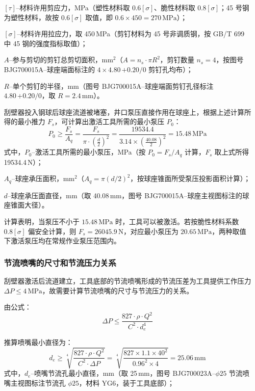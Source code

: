 $[\tau]$--材料许用剪应力，MPa（塑性材料取 $0.6[\sigma]$、脆性材料取 $0.8[\sigma]$；45 号钢为塑性材料，故按 $0.6[\sigma]$ 取值，即 $0.6\times450 = 270\,\mathrm{MPa}$）；

$[\sigma]$--材料许用拉应力，取 450\,MPa（剪钉材料为 45 号非调质钢，按 GB/T 699 中 45 钢的强度指标取值）；

$A$--参与剪切的剪钉总剪切面积，mm$^2$（$A = n_s \cdot \pi R^2$，剪钉数量 $n_s = 4$，按图号 BJG700015A--球座端面标注的 $4\times 4.80\,{+0.20}/0$ 剪钉孔均布）；

$R$--单个剪钉的半径，mm（图号 BJG700015A--球座端面剪钉孔径标注 $4.80\,{+0.20}/0$，取 $R = 2.4$\,mm）。

刮壁器投入钢球后球座流道被堵塞，井口泵压直接作用在球座上，根据上述计算所得的最小推力 $F_s$，可计算出激活工具所需的最小泵压 $P_0$：
\begin{equation}
    P_0 \ge \frac{F_s}{A_q} = \frac{F_s}{\pi \cdot \left(\frac{d}{2}\right)^2} = \frac{19534.4}{3.14 \times \left(\frac{40.08}{2}\right)^2} = 15.48\,\mathrm{MPa}
\end{equation}
式中，$P_0$--激活工具所需的最小泵压，MPa（按 $P_0 = F_s/A_q$ 计算，$F_s$ 取上式所得 19534.4\,N）；

$A_q$--球座承压面积，mm$^2$（$A_q = \pi (d/2)^2$，按球座锥面所受泵压投影面积计算）；

$d$--球座承压面直径，mm（取 40.08\,mm，图号 BJG700015A--球座主视图标注的球座锥面大径）。

计算表明，当泵压不小于 $15.48\,\mathrm{MPa}$ 时，工具可以被激活。若按脆性材料系数 $0.8[\sigma]$ 偏安全计算，则 $F_s = 26045.9\,\mathrm{N}$，对应最小泵压为 $20.65\,\mathrm{MPa}$，两种取值下激活泵压均在常规作业泵压范围内。


\subsubsection{节流喷嘴的尺寸和节流压力关系}

刮壁器激活后流道建立，工具底部的节流喷嘴形成的节流压差为工具提供工作压力 $\Delta P \le 4\,\mathrm{MPa}$，故需要计算节流喷嘴的尺寸与节流压力的关系。

由公式：
\begin{equation}
    \Delta P \le \frac{827 \cdot \rho \cdot Q^2}{C^2 \cdot d_e^4}
\end{equation}

推算喷嘴最小直径为：
\begin{equation}
    d_e \ge \sqrt[4]{\frac{827 \cdot \rho \cdot Q^2}{C^2 \cdot \Delta P}} = \sqrt[4]{\frac{827 \times 1.1 \times 40^2}{0.96^2 \times 4}} = 25.06\,\mathrm{mm}
\end{equation}
式中，$d_e$--喷嘴节流孔最小直径，mm（取 25\,mm，图号 BJG700023A--$\phi 25$ 节流喷嘴主视图标注节流孔 $\phi 25$，材料 YG6，装于工具底部）；

